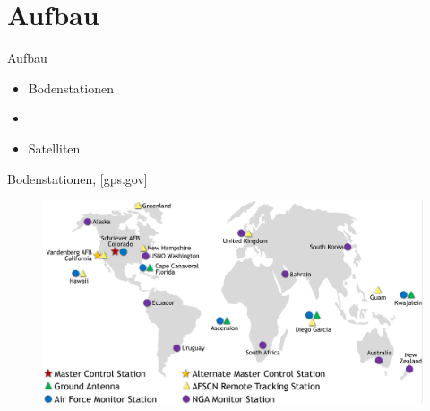 \section{Aufbau}
\begin{frame}{Aufbau}
    \begin{itemize}
        \item Bodenstationen
        \item[]~
        \item Satelliten
    \end{itemize}
\end{frame}

\begin{frame}{Bodenstationen, {\small [gps.gov]}}
    \begin{figure}
        \centering
        \includegraphics[width=\textwidth]{images/GPS-control-segment-map.pdf}
    \end{figure}
\end{frame}

